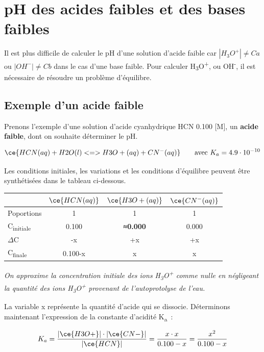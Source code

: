 \documentclass[
  11pt,
  a4paper,
  openany]{book}
\begin{document}
\clearpage

\section{pH des acides faibles et des bases faibles}\label{ph-des-acides-faibles-et-des-bases-faibles}

Il est plus difficile de calculer le pH d'une solution d'acide faible car \(|H_{3}O^{+}| \neq Ca\) ou \(|OH^{-}| \neq Cb\) dans le cas d'une base faible. Pour calculer \textbar H\textsubscript{3}O\textsuperscript{+}\textbar, ou \textbar OH\textsuperscript{-}\textbar, il est nécessaire de résoudre un problème d'équilibre.

\subsection{Exemple d'un acide faible}\label{exemple-dun-acide-faible}

Prenons l'exemple d'une solution d'acide cyanhydrique HCN 0.100 {[}M{]}, un \textbf{acide faible}, dont on souhaite déterminer le pH.

\[
\ce{HCN(aq) + H2O(l) <=> H3O+(aq) + CN^{-}(aq)} \qquad \text{avec } K_a = 4.9 \cdot 10^{-10}
\]

Les conditions initiales, les variations et les conditions d'équilibre peuvent être synthétisées dans le tableau ci-dessous.

\begin{longtable}[]{@{}lccc@{}}
\toprule\noalign{}
& \(\ce{HCN(aq)}\) & \(\ce{H3O+(aq)}\) & \(\ce{CN^{-}(aq)}\) \\
\midrule\noalign{}
\endhead
\bottomrule\noalign{}
\endlastfoot
Poportions & 1 & 1 & 1 \\
C\textsubscript{initiale} & 0.100 & \textbf{≈0.000} & 0.000 \\
\(\Delta\)C & -x & +x & +x \\
C\textsubscript{finale} & 0.100-x & x & x \\
\end{longtable}

\emph{On approxime la concentration initiale des ions H\textsubscript{3}O\textsuperscript{+} comme nulle en négligeant la quantité des ions H\textsubscript{3}O\textsuperscript{+} provenant de l'autoprotolyse de l'eau.}

La variable x représente la quantité d'acide qui se dissocie. Déterminons maintenant l'expression de la constante d'acidité K\textsubscript{a}~:

\[
K_a = \frac{|\ce{H3O+}| \cdot |\ce{CN-}|}{|\ce{HCN}|} = \frac{x \cdot x}{0.100 - x} = \frac{x^2}{0.100 - x}
\]
\end{document}
